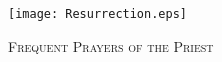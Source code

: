 \fancyhead[RE,LO]{}\fancyhead[RO,LE]{}
\fancyhead[C]{}\thispagestyle{empty}
\mainmatter
{}
{}
  \begin{center}
   \texttt{[image: Resurrection.eps]}
   \par
   \vspace{2ex}
   	\textsc{\Huge{Frequent Prayers of the Priest}}
   \end{center}